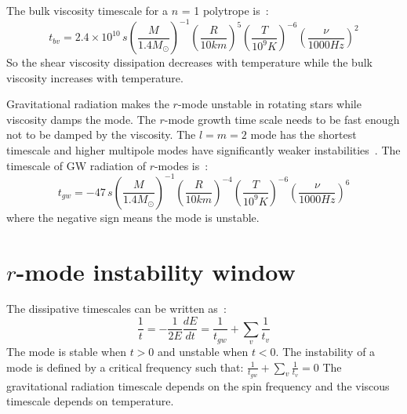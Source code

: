 \documentclass{ttuthes2007}
\begin{document}
The bulk viscosity timescale for a $n$ = 1 polytrope is~\cite{ANDERSSON_2001}:
\begin{equation}
t_{bv}=2.4 \times 10^{10}\,s
\left(\frac{M}{1.4M_\odot}\right)^{-1}\left(\frac{R}{10km}\right)^5\left(\frac{T}{10^9K}\right)^{-6}\left(\frac{\nu}{1000 Hz}\right)^2
\end{equation}
So the shear viscosity dissipation decreases
with temperature while the bulk viscosity increases with temperature.

Gravitational radiation makes the $r$-mode unstable in rotating stars while
viscosity damps the mode. The $r$-mode growth time scale needs to be fast enough not to be damped by the
viscosity. The $l=m=2$ mode has the shortest timescale and higher multipole
modes have
significantly weaker instabilities~\cite{ANDERSSON_2001}. The timescale of
\ac{GW} radiation of $r$-modes is~\cite{ANDERSSON_2001}:
\begin{equation}
t_{gw}=-47\,s                                                       
\left(\frac{M}{1.4M_\odot}\right)^{-1}\left(\frac{R}{10km}\right)^{-4} \left(\frac{T}{10^9K}\right)^{-6}\left(\frac{\nu}{1000
Hz}\right)^6
\end{equation}
where the negative sign means the mode is unstable.

\section{$r$-mode instability window}
The dissipative timescales can be written as~\cite{Owen_2000}:
\begin{equation}
\frac{1}{t}=-\frac{1}{2E}\frac{dE}{dt}=\frac{1}{t_{gw}}+\sum_v \frac{1}{t_v}
\end{equation}
The mode is stable when $t>0$ and unstable when $t<0$. 
The instability of a mode is defined by a critical frequency such that:
$\frac{1}{t_{gw}}+\sum_v \frac{1}{t_v}= 0$
The gravitational radiation timescale depends on the spin frequency and the viscous
timescale depends on temperature. 
\end{document}
